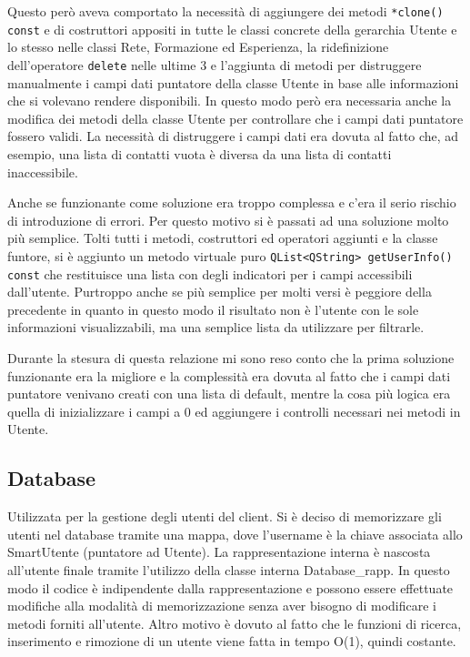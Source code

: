\documentclass[a4paper]{article}
\begin{document}
Questo però aveva comportato la necessità di aggiungere dei metodi \texttt{*clone() const} e di costruttori appositi in tutte le classi concrete della gerarchia Utente e lo stesso nelle classi Rete, Formazione ed Esperienza, la ridefinizione dell'operatore \texttt{delete} nelle ultime 3 e l'aggiunta di metodi per distruggere manualmente i campi dati puntatore della classe Utente in base alle informazioni che si volevano rendere disponibili. In questo modo però era necessaria anche la modifica dei metodi della classe Utente per controllare che i campi dati puntatore fossero validi. La necessità di distruggere i campi dati era dovuta al fatto che, ad esempio, una lista di contatti vuota è diversa da una lista di contatti inaccessibile.

Anche se funzionante come soluzione era troppo complessa e c'era il serio rischio di introduzione di errori. Per questo motivo si è passati ad una soluzione molto più semplice. Tolti tutti i metodi, costruttori ed operatori aggiunti e la classe funtore, si è aggiunto un metodo virtuale puro \texttt{QList<QString> getUserInfo() const} che restituisce una lista con degli indicatori per i campi accessibili dall'utente. Purtroppo anche se più semplice per molti versi è peggiore della precedente in quanto in questo modo il risultato non è l'utente con le sole informazioni visualizzabili, ma una semplice lista da utilizzare per filtrarle.

Durante la stesura di questa relazione mi sono reso conto che la prima soluzione funzionante era la migliore e la complessità era dovuta al fatto che i campi dati puntatore venivano creati con una lista di default, mentre la cosa più logica era quella di inizializzare i campi a 0 ed aggiungere i controlli necessari nei metodi in Utente.

\subsection*{Database}
Utilizzata per la gestione degli utenti del client. Si è deciso di memorizzare gli utenti nel database tramite una mappa, dove l'username è la chiave associata allo SmartUtente (puntatore ad Utente). La rappresentazione interna è nascosta all'utente finale tramite l'utilizzo della classe interna Database\_rapp. In questo modo il codice è indipendente dalla rappresentazione e possono essere effettuate modifiche alla modalità di memorizzazione senza aver bisogno di modificare i metodi forniti all'utente. Altro motivo è dovuto al fatto che le funzioni di ricerca, inserimento e rimozione di un utente viene fatta in tempo O(1), quindi costante.
\end{document}
